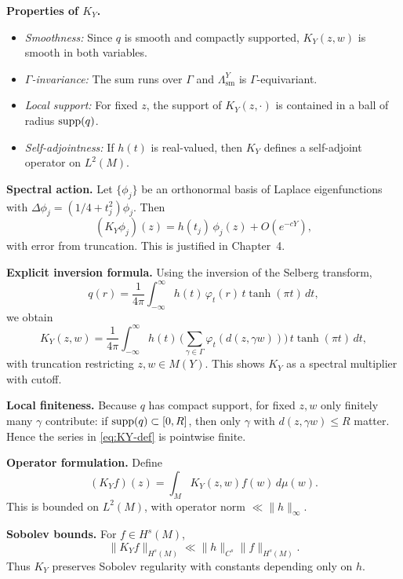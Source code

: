 \noindent\textbf{Properties of $K_{Y}$.}
\begin{itemize}
  \item \emph{Smoothness:} Since $q$ is smooth and compactly supported, 
  $K_{Y}(z,w)$ is smooth in both variables. 
  \item \emph{$\Gamma$-invariance:} The sum runs over $\Gamma$ and $\Lambda^{Y}_{\mathrm{sm}}$ is $\Gamma$-equivariant. 
  \item \emph{Local support:} For fixed $z$, the support of $K_{Y}(z,\cdot)$ is contained in a ball of radius $\operatorname{supp}(q)$. 
  \item \emph{Self-adjointness:} If $h(t)$ is real-valued, then $K_{Y}$ defines a self-adjoint operator on $L^{2}(M)$. 
\end{itemize}

\medskip

\noindent\textbf{Spectral action.}
Let $\{\phi_{j}\}$ be an orthonormal basis of Laplace eigenfunctions with $\Delta\phi_{j} = (1/4+t_{j}^{2})\phi_{j}$.
Then
\[
  (K_{Y}\phi_{j})(z) = h(t_{j})\,\phi_{j}(z) + O(e^{-cY}),
\]
with error from truncation.
This is justified in Chapter~4.

\medskip

\noindent\textbf{Explicit inversion formula.}
Using the inversion of the Selberg transform,
\[
  q(r) = \frac{1}{4\pi}\int_{-\infty}^{\infty} h(t)\,\varphi_{t}(r)\,t\tanh(\pi t)\,dt,
\]
we obtain
\[
  K_{Y}(z,w) = \frac{1}{4\pi}\int_{-\infty}^{\infty}
  h(t)\,\Bigg(\sum_{\gamma\in\Gamma}\varphi_{t}(d(z,\gamma w))\Bigg)\,
  t\tanh(\pi t)\,dt,
\]
with truncation restricting $z,w\in M(Y)$.
This shows $K_{Y}$ as a spectral multiplier with cutoff.

\medskip

\noindent\textbf{Local finiteness.}
Because $q$ has compact support, for fixed $z,w$ only finitely many $\gamma$ contribute:
if $\operatorname{supp}(q)\subset[0,R]$, then only $\gamma$ with $d(z,\gamma w)\le R$ matter.
Hence the series in \eqref{eq:KY-def} is pointwise finite.

\medskip

\noindent\textbf{Operator formulation.}
Define
\[
  (K_{Y}f)(z) = \int_{M} K_{Y}(z,w)f(w)\,d\mu(w).
\]
This is bounded on $L^{2}(M)$, with operator norm $\ll \|h\|_{\infty}$.

\medskip

\noindent\textbf{Sobolev bounds.}
For $f\in H^{s}(M)$,
\[
  \|K_{Y}f\|_{H^{s}(M)} \ll \|h\|_{C^{s}} \|f\|_{H^{s}(M)}.
\]
Thus $K_{Y}$ preserves Sobolev regularity with constants depending only on $h$.

